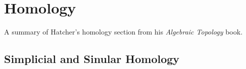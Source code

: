 \chapter{Homology}
A summary of Hatcher's homology section from his \emph{Algebraic Topology}
book.
\section{Simplicial and Sinular Homology}


